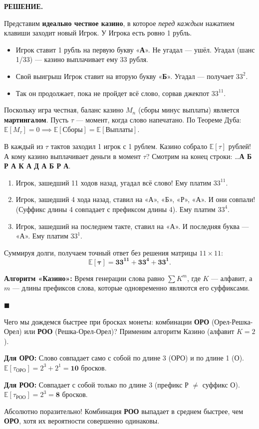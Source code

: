 \documentclass[12pt,a4paper]{article}
\newcommand{\E}{\mathbb{E}}
\newenvironment{solution}{
    \begin{tcolorbox}[
        enhanced, breakable, blanker,
        borderline west={2.5pt}{0pt}{solgray},
        left=12pt, top=5pt, bottom=5pt,
        before skip=10pt, after skip=15pt
    ]
    \textbf{\textsf{РЕШЕНИЕ.}}\;
}{
    \hfill $\blacksquare$
    \end{tcolorbox}
}
\begin{document}
\begin{solution}
Представим \textbf{идеально честное казино}, в которое \textit{перед каждым} нажатием клавиши заходит новый Игрок. У Игрока есть ровно 1 рубль.
\begin{itemize}
    \item Игрок ставит 1 рубль на первую букву «\textbf{А}». Не угадал — ушёл. Угадал (шанс 1/33) — казино выплачивает ему $33$ рубля.
    \item Свой выигрыш Игрок ставит на вторую букву «\textbf{Б}». Угадал — получает $33^2$.
    \item Так он продолжает, пока не пройдет всё слово, сорвав джекпот $33^{11}$.
\end{itemize}

Поскольку игра честная, баланс казино $M_n$ (сборы минус выплаты) является \textbf{мартингалом}.
Пусть $\tau$ — момент, когда слово напечатано. По Теореме Дуба: $\E[M_\tau] = 0 \implies \E[\text{Сборы}] = \E[\text{Выплаты}]$.

В каждый из $\tau$ тактов заходил 1 игрок с 1 рублем. Казино собрало $\E[\tau]$ рублей!
А кому казино выплачивает деньги в момент $\tau$? Смотрим на конец строки:
\dots \textbf{А Б Р А К А Д А Б Р А}.
\begin{enumerate}
    \item Игрок, зашедший 11 ходов назад, угадал всё слово! Ему платим \textbf{$33^{11}$}.
    \item Игрок, зашедший 4 хода назад, ставил на «А», «Б», «Р», «А». И они совпали! (Суффикс длины 4 совпадает с префиксом длины 4). Ему платим \textbf{$33^4$}.
    \item Игрок, зашедший на последнем такте, ставил на «А». И последняя буква — «А». Ему платим \textbf{$33^1$}.
\end{enumerate}

Суммируя долги, получаем точный ответ без решения матрицы $11 \times 11$:
\[ \mathbf{\E[\tau] = 33^{11} + 33^4 + 33^1}. \]

\textbf{Алгоритм «Казино»:} Время генерации слова равно $\sum K^m$, где $K$ --- алфавит, а $m$ --- длины префиксов слова, которые одновременно являются его суффиксами.
\end{solution}

\begin{insight}
Чего мы дождемся быстрее при бросках монеты: комбинации \textbf{ОРО} (Орел-Решка-Орел) или \textbf{РОО} (Решка-Орел-Орел)? Применим алгоритм Казино (алфавит $K=2$).

\textbf{Для ОРО:} Слово совпадает само с собой по длине 3 (ОРО) и по длине 1 (О). 
$\E[\tau_{ОРО}] = 2^3 + 2^1 = \mathbf{10}$ бросков.

\textbf{Для РОО:} Совпадает с собой только по длине 3 (префикс Р $\neq$ суффикс О). 
$\E[\tau_{РОО}] = 2^3 = \mathbf{8}$ бросков.

Абсолютно поразительно! Комбинация \textbf{РОО} выпадает в среднем быстрее, чем \textbf{ОРО}, хотя их вероятности совершенно одинаковы. 
\end{insight}
\end{document}
